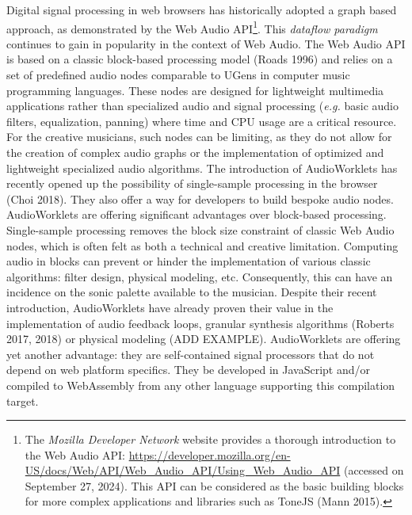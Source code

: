 \documentclass[11pt,]{article}
\begin{document}
Digital signal processing in web browsers has historically adopted a
graph based approach, as demonstrated by the Web Audio API\footnote{The
  \emph{Mozilla Developer Network} website provides a thorough
  introduction to the Web Audio API:
  \url{https://developer.mozilla.org/en-US/docs/Web/API/Web_Audio_API/Using_Web_Audio_API}
  (accessed on September 27, 2024). This API can be considered as the
  basic building blocks for more complex applications and libraries such
  as ToneJS (Mann 2015).}. This \emph{dataflow paradigm} continues to
gain in popularity in the context of Web Audio. The Web Audio API is
based on a classic block-based processing model (Roads 1996) and relies
on a set of predefined audio nodes comparable to UGens in computer music
programming languages. These nodes are designed for lightweight
multimedia applications rather than specialized audio and signal
processing (\emph{e.g.} basic audio filters, equalization, panning)
where time and CPU usage are a critical resource. For the creative
musicians, such nodes can be limiting, as they do not allow for the
creation of complex audio graphs or the implementation of optimized and
lightweight specialized audio algorithms. The introduction of
AudioWorklets has recently opened up the possibility of single-sample
processing in the browser (Choi 2018). They also offer a way for
developers to build bespoke audio nodes. AudioWorklets are offering
significant advantages over block-based processing. Single-sample
processing removes the block size constraint of classic Web Audio nodes,
which is often felt as both a technical and creative limitation.
Computing audio in blocks can prevent or hinder the implementation of
various classic algorithms: filter design, physical modeling, etc.
Consequently, this can have an incidence on the sonic palette available
to the musician. Despite their recent introduction, AudioWorklets have
already proven their value in the implementation of audio feedback
loops, granular synthesis algorithms (Roberts 2017, 2018) or physical
modeling (ADD EXAMPLE). AudioWorklets are offering yet another
advantage: they are self-contained signal processors that do not depend
on web platform specifics. They be developed in JavaScript and/or
compiled to WebAssembly from any other language supporting this
compilation target.
\end{document}
